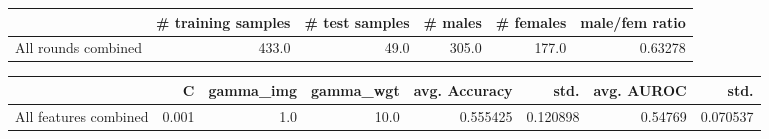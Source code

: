 \begin{tabular}{lrrrrr}
\hline
{} &  \# training samples &  \# test samples &  \# males &  \# females &  male/fem ratio \\
\hline
All rounds combined &               433.0 &            49.0 &    305.0 &      177.0 &         0.63278 \\
\hline
\end{tabular}
\begin{tabular}{lrrrrrrr}
\hline
{} &      C &  gamma\_img &  gamma\_wgt &  avg. Accuracy &      std. &  avg. AUROC &      std. \\
\hline
All features combined &  0.001 &        1.0 &       10.0 &       0.555425 &  0.120898 &     0.54769 &  0.070537 \\
\hline
\end{tabular}
